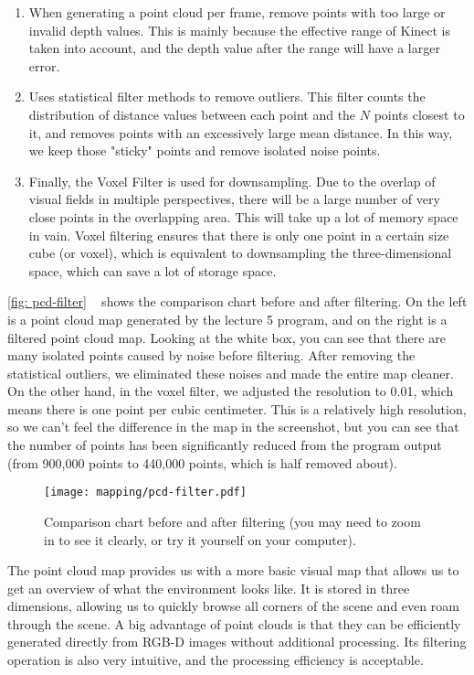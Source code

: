 \begin{enumerate}
\item When generating a point cloud per frame, remove points with too large or invalid depth values. This is mainly because the effective range of Kinect is taken into account, and the depth value after the range will have a larger error.
\item Uses statistical filter methods to remove outliers. This filter counts the distribution of distance values ​​between each point and the $ N $ points closest to it, and removes points with an excessively large mean distance. In this way, we keep those "sticky" points and remove isolated noise points.
\item Finally, the Voxel Filter is used for downsampling. Due to the overlap of visual fields in multiple perspectives, there will be a large number of very close points in the overlapping area. This will take up a lot of memory space in vain. Voxel filtering ensures that there is only one point in a certain size cube (or voxel), which is equivalent to downsampling the three-dimensional space, which can save a lot of storage space.
\end{enumerate}

\autoref{fig: pcd-filter} ~ shows the comparison chart before and after filtering. On the left is a point cloud map generated by the lecture 5 program, and on the right is a filtered point cloud map. Looking at the white box, you can see that there are many isolated points caused by noise before filtering. After removing the statistical outliers, we eliminated these noises and made the entire map cleaner. On the other hand, in the voxel filter, we adjusted the resolution to 0.01, which means there is one point per cubic centimeter. This is a relatively high resolution, so we can't feel the difference in the map in the screenshot, but you can see that the number of points has been significantly reduced from the program output (from 900,000 points to 440,000 points, which is half removed about).

\begin{figure}[! ht]
\centering
\texttt{[image: mapping/pcd-filter.pdf]}
\caption{Comparison chart before and after filtering (you may need to zoom in to see it clearly, or try it yourself on your computer). }
\label{fig: pcd-filter}
\end{figure}

The point cloud map provides us with a more basic visual map that allows us to get an overview of what the environment looks like. It is stored in three dimensions, allowing us to quickly browse all corners of the scene and even roam through the scene. A big advantage of point clouds is that they can be efficiently generated directly from RGB-D images without additional processing. Its filtering operation is also very intuitive, and the processing efficiency is acceptable.

